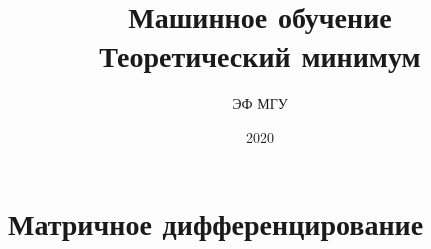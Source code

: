 \documentclass[a4paper, 12pt]{article}
\title{Машинное обучение \\ Теоретический минимум}
\author{ЭФ МГУ}
\date{2020}
\theoremstyle{plain} %
\theoremstyle{definition} %
\theoremstyle{remark} %
\begin{document}
\maketitle

\section{Матричное дифференцирование}
\end{document}
